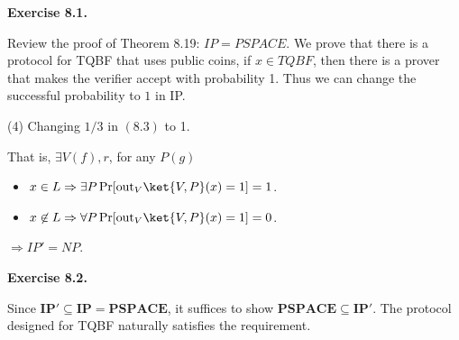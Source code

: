 \documentclass[a4paper]{article}
\newenvironment{exercise}[1]{
	\par
	\noindent\textbf{Exercise #1.}\quad
}{
	\par
	\bigskip
}
\begin{document}
\begin{exercise}{8.1}
Review the proof of Theorem 8.19: $IP = PSPACE$. We prove that there is a protocol for TQBF that uses public coins, if $x\in TQBF$, then there is a prover that makes the verifier accept with probability 1. Thus we can change the successful probability to $1$ in IP.

(4) Changing $1/3$ in $(8.3)$ to 1.

That is, $\exists V (f), r$, for any $P (g)$
\begin{itemize}
\item $x \in L \Rightarrow \exists P\Pr[\text{out}_{V}\ket{V,P}(x) = 1] = 1$. 
\item $x \not\in L \Rightarrow \forall P \Pr[\text{out}_{V}\ket{V,P}(x) = 1]  =0$.  
\end{itemize}
$\Rightarrow IP' = NP$.
\end{exercise}

\begin{exercise}{8.2}
    Since $\textbf{IP}'\subseteq\textbf{IP}=\textbf{PSPACE}$, it suffices to show $\textbf{PSPACE}\subseteq\textbf{IP}'$.
    The protocol designed for TQBF naturally satisfies the requirement.
\end{exercise}
\end{document}
